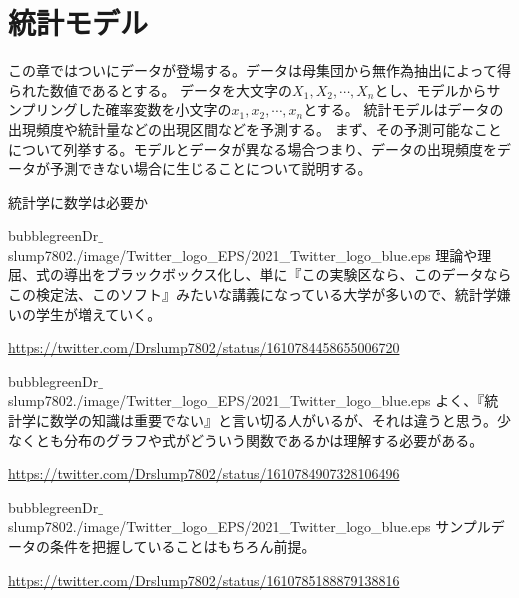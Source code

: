 \chapter{統計モデル}
この章ではついにデータが登場する。データは母集団から無作為抽出によって得られた数値であるとする。
データを大文字の$X_1,X_2,\cdots,X_n$とし、モデルからサンプリングした確率変数を小文字の$x_1,x_2,\cdots,x_n$とする。
統計モデルはデータの出現頻度や統計量などの出現区間などを予測する。
まず、その予測可能なことについて列挙する。モデルとデータが異なる場合つまり、データの出現頻度をデータが予測できない場合に生じることについて説明する。
\begin{SMbox}{統計学に数学は必要か}

    \begin{rightbubbles}{bubblegreen}{Dr$\_$slump7802}{./image/Twitter_logo_EPS/2021_Twitter_logo_blue.eps}
        理論や理屈、式の導出をブラックボックス化し、単に『この実験区なら、このデータならこの検定法、このソフト』みたいな講義になっている大学が多いので、統計学嫌いの学生が増えていく。

            \begin{flushright} 
                \small	\url{https://twitter.com/Drslump7802/status/1610784458655006720}
            \end{flushright}    
    \end{rightbubbles}

    \begin{rightbubbles}{bubblegreen}{Dr$\_$slump7802}{./image/Twitter_logo_EPS/2021_Twitter_logo_blue.eps}
        よく、『統計学に数学の知識は重要でない』と言い切る人がいるが、それは違うと思う。少なくとも分布のグラフや式がどういう関数であるかは理解する必要がある。

            \begin{flushright} 
                \small	\url{https://twitter.com/Drslump7802/status/1610784907328106496}
            \end{flushright}    
        \end{rightbubbles}

    \begin{rightbubbles}{bubblegreen}{Dr$\_$slump7802}{./image/Twitter_logo_EPS/2021_Twitter_logo_blue.eps}
        サンプルデータの条件を把握していることはもちろん前提。
            \begin{flushright} 
                \small	\url{https://twitter.com/Drslump7802/status/1610785188879138816}
            \end{flushright}    
        \end{rightbubbles}


\end{SMbox}
